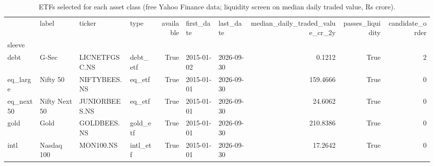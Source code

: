 \begin{table}
\caption{ETFs selected for each asset class (free Yahoo Finance data; liquidity screen on median daily traded value, Rs crore).}
\label{tab:T01_etf_selection}
\begin{tabular}{llllrllrrr}
\toprule
 & label & ticker & type & available & first\_date & last\_date & median\_daily\_traded\_value\_cr\_2y & passes\_liquidity & candidate\_order \\
sleeve &  &  &  &  &  &  &  &  &  \\
\midrule
debt & G-Sec & LICNETFGSC.NS & debt\_etf & True & 2015-01-02 & 2026-09-30 & 0.1212 & True & 2 \\
eq\_large & Nifty 50 & NIFTYBEES.NS & eq\_etf & True & 2015-01-01 & 2026-09-30 & 159.4666 & True & 0 \\
eq\_next50 & Nifty Next 50 & JUNIORBEES.NS & eq\_etf & True & 2015-01-01 & 2026-09-30 & 24.6062 & True & 0 \\
gold & Gold & GOLDBEES.NS & gold\_etf & True & 2015-01-01 & 2026-09-30 & 210.8386 & True & 0 \\
intl & Nasdaq 100 & MON100.NS & intl\_etf & True & 2015-01-01 & 2026-09-30 & 17.2642 & True & 0 \\
\bottomrule
\end{tabular}
\end{table}
